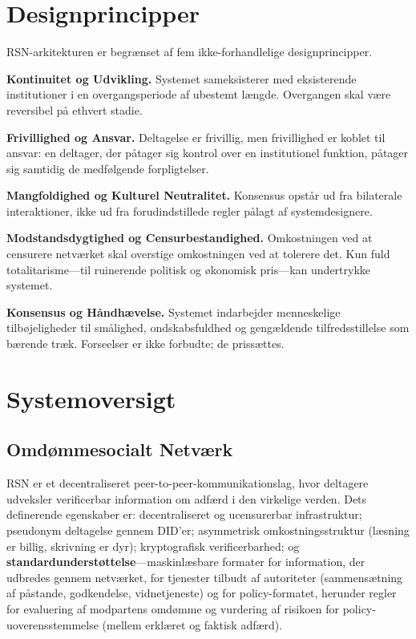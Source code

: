 \documentclass[11pt,a4paper,twocolumn]{article}
\begin{document}
\section{Designprincipper}

RSN-arkitekturen er begrænset af fem ikke-forhandlelige designprincipper.

\textbf{Kontinuitet og Udvikling.} Systemet sameksisterer med eksisterende institutioner i en overgangsperiode af ubestemt længde. Overgangen skal være reversibel på ethvert stadie.

\textbf{Frivillighed og Ansvar.} Deltagelse er frivillig, men frivillighed er koblet til ansvar: en deltager, der påtager sig kontrol over en institutionel funktion, påtager sig samtidig de medfølgende forpligtelser.

\textbf{Mangfoldighed og Kulturel Neutralitet.} Konsensus opstår ud fra bilaterale interaktioner, ikke ud fra forudindstillede regler pålagt af systemdesignere.

\textbf{Modstandsdygtighed og Censurbestandighed.} Omkostningen ved at censurere netværket skal overstige omkostningen ved at tolerere det. Kun fuld totalitarisme---til ruinerende politisk og økonomisk pris---kan undertrykke systemet.

\textbf{Konsensus og Håndhævelse.} Systemet indarbejder menneskelige tilbøjeligheder til smålighed, ondskabsfuldhed og gengældende tilfredsstillelse som bærende træk. Forseelser er ikke forbudte; de prissættes.

\section{Systemoversigt}

\subsection{Omdømmesocialt Netværk}

RSN er et decentraliseret peer-to-peer-kommunikationslag, hvor deltagere udveksler verificerbar information om adfærd i den virkelige verden. Dets definerende egenskaber er: decentraliseret og ucensurerbar infrastruktur; pseudonym deltagelse gennem DID'er; asymmetrisk omkostningsstruktur (læsning er billig, skrivning er dyr); kryptografisk verificerbarhed; og \textbf{standardunderstøttelse}---maskinlæsbare formater for information, der udbredes gennem netværket, for tjenester tilbudt af autoriteter (sammensætning af påstande, godkendelse, vidnetjeneste) og for policy-formatet, herunder regler for evaluering af modpartens omdømme og vurdering af risikoen for policy-uoverensstemmelse (mellem erklæret og faktisk adfærd).
\end{document}
